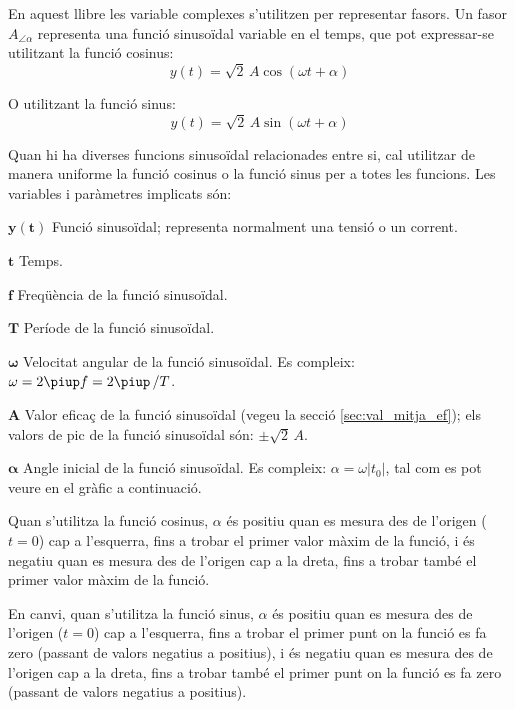 En aquest llibre les variable complexes s'utilitzen per representar fasors. Un fasor $A_{\angle \alpha}$ representa una funció sinusoïdal variable en el temps, que pot expressar-se utilitzant la funció cosinus:
\[y(t)=\sqrt{2}\, A \cos(\omega t + \alpha)\]

O utilitzant la funció sinus:
\[y(t)=\sqrt{2}\, A \sin(\omega t + \alpha)\]

Quan hi ha diverses funcions sinusoïdal relacionades entre si, cal utilitzar de manera uniforme la funció cosinus o la funció sinus per a totes les funcions. Les variables i paràmetres implicats són:
\begin{list}{}
{\setlength{\labelwidth}{15mm} \setlength{\leftmargin}{20mm}
\setlength{\labelsep}{5mm}}
    \item[$\boldsymbol{y(t)}$] Funció sinusoïdal; representa normalment una tensió o un corrent.
    \item[$\boldsymbol{t}$] Temps.
    \item[$\boldsymbol{f}$] Freqüència de la funció sinusoïdal.
    \item[$\boldsymbol{T}$] Període de la funció sinusoïdal.
    \item[$\boldsymbol{\omega}$] Velocitat angular de la funció sinusoïdal. Es compleix: $\omega = 2 \piup f = 2 \piup\,/T$.
    \item[$\boldsymbol{A}$] Valor eficaç de la funció sinusoïdal (vegeu la secció \vref{sec:val_mitja_ef}); els valors de pic de la funció sinusoïdal  són:  $\pm\sqrt{2}\, A$.
    \item[$\boldsymbol{\alpha}$] Angle inicial de la funció sinusoïdal. Es compleix:  $\alpha=\omega |t_0|$, tal com es pot veure en el gràfic a continuació.

    Quan s'utilitza la funció cosinus, $\alpha$ és positiu quan es mesura des de l'origen ($t=0$) cap a l'esquerra, fins a trobar el primer valor màxim de la funció, i és negatiu quan es mesura des de l'origen cap a la dreta, fins a trobar també el primer valor màxim de la funció.

    En canvi, quan s'utilitza la funció sinus, $\alpha$ és positiu quan es mesura des de l'origen ($t=0$) cap a l'esquerra, fins a trobar el primer punt on la funció es fa zero (passant de valors negatius a positius), i és negatiu quan es mesura des de l'origen cap a la dreta, fins a trobar també el primer punt on la funció es fa zero (passant de valors negatius a positius).
    \item[] 
\end{list}

